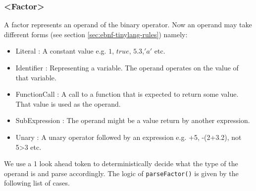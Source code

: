\subsubsection{<Factor>}
\label{sec:parse factor expression}
A factor represents an operand of the binary operator. Now an operand may take different forms (see section \ref{sec:ebnf-tinylang-rules}) namely:
\begin{itemize}
	\item Literal : A constant value e.g. $1$, $true$, $5.3$,$'a'$ etc.
	\item Identifier : Representing a variable. The operand operates on the value of that variable.
	\item FunctionCall : A call to a function that is expected to return some value. That value is used as the operand.
	\item SubExpression : The operand might be a value return by another expression.
	\item Unary  : A unary operator followed by an expression e.g. +5,  -(2+3.2), not 5>3 etc.
\end{itemize}
We use a 1 look ahead token to deterministically decide what the type of the operand is and parse accordingly.
\vskip 0.1in
The logic of \verb!parseFactor()! is given by the following list of cases.

